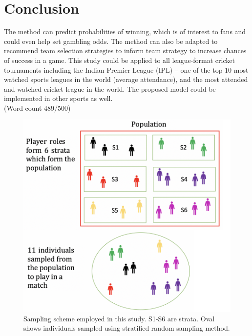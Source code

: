 \documentclass[paper=a4, 12pt, twoside]{article}
\begin{document}
			\section*{Conclusion}\label{conclusion}
		 The method can predict probabilities of winning, which is of interest to fans and could even help set gambling odds. The method can also be adapted to recommend team selection strategies to inform team strategy to increase chances of success in a game. This study could be applied to all league-format cricket tournaments including the Indian Premier League (IPL) -- one of the top 10 most watched sports leagues in the world (average attendance), and the most attended and watched cricket league in the world. The proposed model could be implemented in other sports as well. \\
		 (Word count 489/500)
\cleardoublepage
 \begin{figure}[h]
	\centering
	\includegraphics[scale=0.70]{samplingscheme} 
	\caption{Sampling scheme employed in this study. S1-S6 are strata. Oval shows individuals sampled using stratified random sampling method. }
	\label{samplingscheme}
\end{figure}
\end{document}
